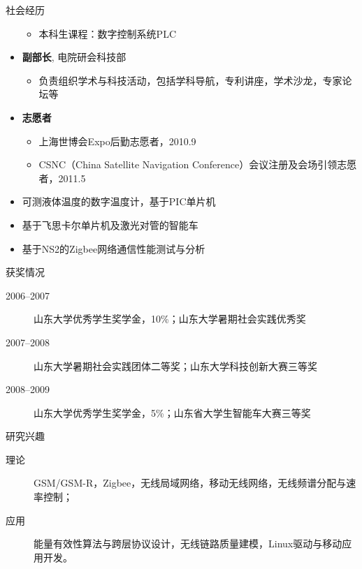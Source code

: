 \begin{resume}
\begin{resumesection}{社会经历}
\begin{itemize}
  \begin{itemize}
      \item 本科生课程：数字控制系统PLC
  \end{itemize}
\item \textbf{副部长}, 电院研会科技部
  \begin{itemize}
    \item 负责组织学术与科技活动，包括学科导航，专利讲座，学术沙龙，专家论坛等
  \end{itemize}
\item \textbf{志愿者}
  \begin{itemize}
  \item 上海世博会Expo后勤志愿者，2010.9
  \item CSNC（China Satellite Navigation Conference）会议注册及会场引领志愿者，2011.5
  \end{itemize}
\end{itemize}
\begin{itemize}
  \item 可测液体温度的数字温度计，基于PIC单片机
  \item 基于飞思卡尔单片机及激光对管的智能车
  \item 基于NS2的Zigbee网络通信性能测试与分析
\end{itemize}
\end{resumesection}

\begin{resumesection}{获奖情况}
\begin{description}
  \item[2006--2007] 山东大学优秀学生奖学金，10\%；山东大学暑期社会实践优秀奖
  \item[2007--2008] 山东大学暑期社会实践团体二等奖；山东大学科技创新大赛三等奖
  \item[2008--2009] 山东大学优秀学生奖学金，5\%；山东省大学生智能车大赛三等奖
\end{description}
\end{resumesection}

\begin{resumesection}{研究兴趣}
\begin{description}
  \item[理论] GSM/GSM-R，Zigbee，无线局域网络，移动无线网络，无线频谱分配与速率控制；
  \item[应用] 能量有效性算法与跨层协议设计，无线链路质量建模，Linux驱动与移动应用开发。
\end{description}
\end{resumesection}


\end{resume}
